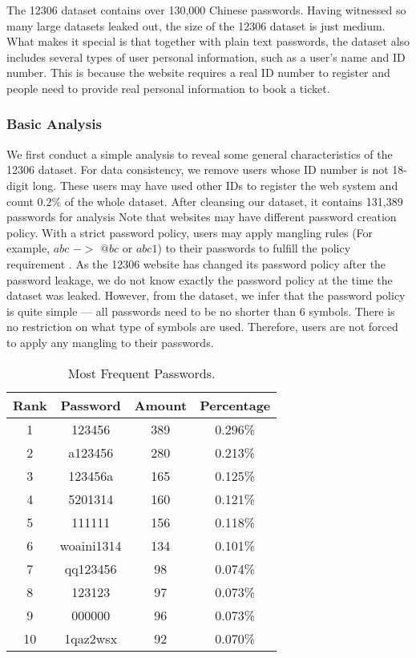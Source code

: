 The 12306 dataset contains over 130,000 Chinese passwords. Having witnessed so many large datasets  leaked out, the size of the 12306 dataset is just medium. What makes it special is that together with plain text passwords, the dataset also includes several types of user personal information, such as a user's name and ID number. This is because the website requires a real ID number to register and people need to provide real personal information to book a ticket. 

\subsubsection{Basic Analysis}
We first conduct a simple analysis to reveal some general characteristics of the 12306 dataset. 
For data consistency, we remove users whose ID number is not 18-digit long. These users may have used other IDs to register the web system and count 0.2\% of the whole dataset. After cleansing our dataset, it contains 131,389 passwords for analysis
Note that websites may have different password creation policy. With a strict password policy, users may apply mangling rules (For example, $abc$ $->$ $@bc$ or $abc1$) to their passwords to fulfill the policy requirement \cite{weir2010testing}. As the 12306 website has changed its password policy after the password leakage, we do not know exactly the password policy at the time the dataset was leaked. However, from the dataset, we infer that  the password policy is quite simple --- all passwords need to be no shorter than 6 symbols. There is no restriction on what type of symbols are used. Therefore, users are not forced to apply any mangling to their passwords. 

\begin{table}
\centering
\caption{Most Frequent Passwords.}
\begin{tabular}{|c|c|c|c|} \hline
Rank&Password&Amount&Percentage\\ \hline
1&123456&389&0.296\%\\ 
2&a123456&280&0.213\%\\ 
3&123456a&165&0.125\%\\ 
4&5201314&160&0.121\%\\ 
5&111111&156&0.118\%\\ 
6&woaini1314&134&0.101\%\\ 
7&qq123456&98&0.074\%\\ 
8&123123&97&0.073\%\\ 
9&000000&96&0.073\%\\ 
10&1qaz2wsx&92&0.070\%\\ 
\hline\end{tabular}
\label{t1}
\end{table}

